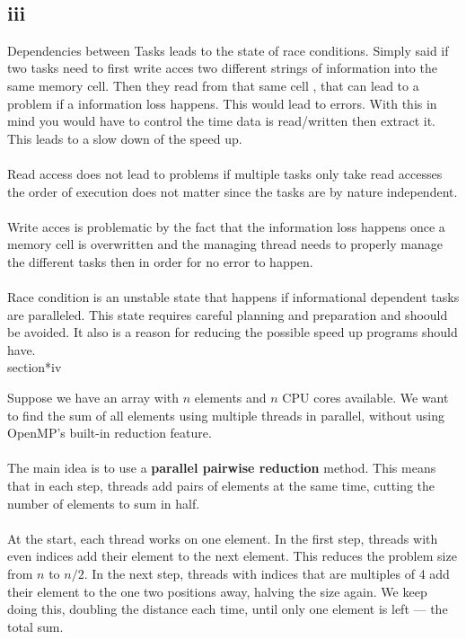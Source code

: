 \documentclass[a4paper]{article}
\begin{document}
\\

\subsection*{iii}
Dependencies between Tasks leads to the state of race conditions. Simply said if two tasks need to first write acces two different strings of information into the same memory cell. Then they read from that same cell , that can lead to a problem if a information loss happens. This would lead to errors. With this in mind you would have to control the time data is read/written then extract it. This leads to a slow down of the speed up.
\\
\\
Read access does not lead to problems if multiple tasks only take read accesses the order of execution does not matter since the tasks are by nature independent. \\
\\
Write acces is problematic by the fact that the information loss happens once a memory cell is overwritten and the managing thread needs to properly manage the different tasks then in order for no error to happen.
\\
\\
Race condition is an unstable state that happens if informational dependent tasks are paralleled. This state requires careful planning and preparation and shoould be avoided. It also is a reason for reducing the possible speed up programs should have.
\\
\sub section*{iv}

Suppose we have an array with \(n\) elements and \(n\) CPU cores available. We want to find the sum of all elements using multiple threads in parallel, without using OpenMP's built-in reduction feature.\\ \\

The main idea is to use a \textbf{parallel pairwise reduction} method. This means that in each step, threads add pairs of elements at the same time, cutting the number of elements to sum in half.\\ \\

At the start, each thread works on one element. In the first step, threads with even indices add their element to the next element. This reduces the problem size from \(n\) to \(n/2\). In the next step, threads with indices that are multiples of 4 add their element to the one two positions away, halving the size again. We keep doing this, doubling the distance each time, until only one element is left — the total sum.\\ \\
\end{document}
